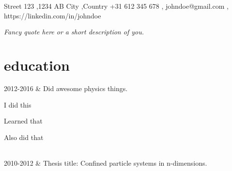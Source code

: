 \documentclass[changecolor={206, 23, 21}]{cv-roald}
\begin{document}
\pagestyle{empty} %

    {\faMapMarker \hspace{\FAspace} Street 123 \sep 1234 AB City \sep Country}
    {\faMobile \hspace{\FAspace} +31 612 345 678 \sep 
     \faEnvelope \hspace{\FAspace} johndoe@gmail.com \sep 
     \faLinkedinSquare \hspace{\FAspace} https://linkedin.com/in/johndoe
}


\textit{Fancy quote here or a short description of you.}

\section*{education}
\begin{tabularcv}
    2012-2016   &   
    \newline Did awesome physics things.
    \begin{tabitemize}
        \item I did this
        \item Learned that
        \item Also did that
    \end{tabitemize} 
    \\[\vspacepar] %
    2010-2012   &   
    \newline Thesis title: Confined particle systems in n-dimensions.
\end{tabularcv}
\end{document}
